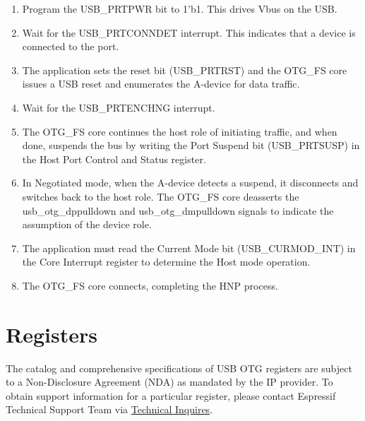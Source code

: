 \documentclass[main\_\_EN.tex]{subfiles}
\begin{document}
\begin{enumerate}
\begin{enumerate}
    \end{enumerate}
    \item Program the USB\_PRTPWR bit to 1'b1. This drives Vbus on the USB.
    \item Wait for the USB\_PRTCONNDET interrupt. This indicates that a device is connected to the port.
    \item The application sets the reset bit (USB\_PRTRST) and the OTG\_FS core issues a USB reset and enumerates the A-device for data traffic.
    \item Wait for the USB\_PRTENCHNG interrupt.
    \item The OTG\_FS core continues the host role of initiating traffic, and when done, suspends the bus by writing the Port Suspend bit (USB\_PRTSUSP) in the Host Port Control and Status register.
    \item In Negotiated mode, when the A-device detects a suspend, it disconnects and switches back to the host role. The OTG\_FS core deasserts the usb\_otg\_dppulldown and usb\_otg\_dmpulldown signals to indicate the assumption of the device role.
    \item The application must read the Current Mode bit (USB\_CURMOD\_INT) in the Core Interrupt register to determine the Host mode operation.
    \item The OTG\_FS core connects, completing the HNP process.
\end{enumerate}






\section{Registers}

The catalog and comprehensive specifications of USB OTG registers are subject to a Non-Disclosure Agreement (NDA) as mandated by the IP provider. To obtain support information for a particular register, please contact Espressif Technical Support Team via \href{https://www.espressif.com/en/contact-us/technical-inquiries}{Technical Inquires}.
\end{document}
